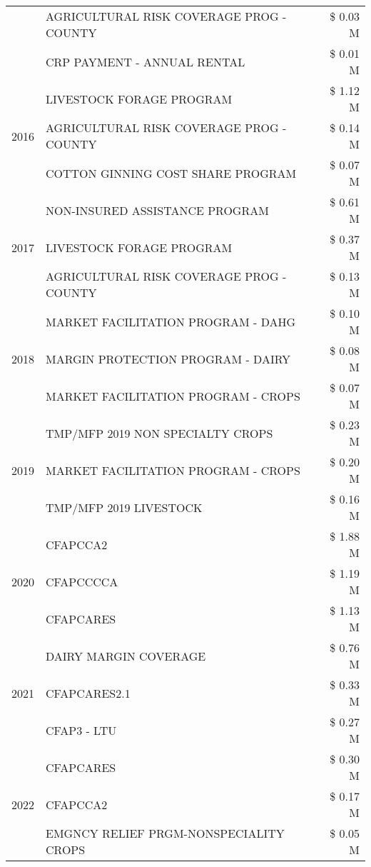 \begin{tabular}{llr}
 & AGRICULTURAL RISK COVERAGE PROG - COUNTY & \$ 0.03 M \\
 & CRP PAYMENT - ANNUAL RENTAL & \$ 0.01 M \\
\cline{1-3}
\multirow[t]{3}{*}{2016} & LIVESTOCK FORAGE PROGRAM & \$ 1.12 M \\
 & AGRICULTURAL RISK COVERAGE PROG - COUNTY & \$ 0.14 M \\
 & COTTON GINNING COST SHARE PROGRAM & \$ 0.07 M \\
\cline{1-3}
\multirow[t]{3}{*}{2017} & NON-INSURED ASSISTANCE PROGRAM & \$ 0.61 M \\
 & LIVESTOCK FORAGE PROGRAM & \$ 0.37 M \\
 & AGRICULTURAL RISK COVERAGE PROG - COUNTY & \$ 0.13 M \\
\cline{1-3}
\multirow[t]{3}{*}{2018} & MARKET FACILITATION PROGRAM - DAHG & \$ 0.10 M \\
 & MARGIN PROTECTION PROGRAM - DAIRY & \$ 0.08 M \\
 & MARKET FACILITATION PROGRAM - CROPS & \$ 0.07 M \\
\cline{1-3}
\multirow[t]{3}{*}{2019} & TMP/MFP 2019 NON SPECIALTY CROPS & \$ 0.23 M \\
 & MARKET FACILITATION PROGRAM - CROPS & \$ 0.20 M \\
 & TMP/MFP 2019 LIVESTOCK & \$ 0.16 M \\
\cline{1-3}
\multirow[t]{3}{*}{2020} & CFAPCCA2 & \$ 1.88 M \\
 & CFAPCCCCA & \$ 1.19 M \\
 & CFAPCARES & \$ 1.13 M \\
\cline{1-3}
\multirow[t]{3}{*}{2021} & DAIRY MARGIN COVERAGE & \$ 0.76 M \\
 & CFAPCARES2.1 & \$ 0.33 M \\
 & CFAP3 - LTU & \$ 0.27 M \\
\cline{1-3}
\multirow[t]{3}{*}{2022} & CFAPCARES & \$ 0.30 M \\
 & CFAPCCA2 & \$ 0.17 M \\
 & EMGNCY RELIEF PRGM-NONSPECIALITY CROPS & \$ 0.05 M \\
\cline{1-3}
\bottomrule
\end{tabular}
